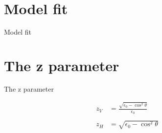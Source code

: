 \documentclass[10pt]{beamer}
\begin{document}
\section{Model fit}
\begin{frame}{Model fit}
\begin{minipage}{0.45\textwidth}
\resizebox{\textwidth}{!}{

}
\end{minipage}
\begin{minipage}{0.45\textwidth}
\resizebox{\textwidth}{!}{

}
\end{minipage}
\begin{minipage}{0.45\textwidth}
\resizebox{\textwidth}{!}{

}
\end{minipage}
\begin{minipage}{0.45\textwidth}

\end{minipage}

\end{frame}


\section{The z parameter}
\begin{frame}{The z parameter}
\begin{minipage}{0.35\textwidth}
\begin{align*}
z_V &= \frac{\sqrt{\epsilon_{0}-\cos^{2}\theta}}{\epsilon_{0}} \\
\\
z_H &= \sqrt{\epsilon_{0}-\cos^{2}\theta}
\end{align*}
\end{minipage}
\begin{minipage}{0.6\textwidth}
\resizebox{\textwidth}{!}{

}
\end{minipage}
\end{frame}


{\aauwavesbg
\begin{frame}
\end{frame}}
\end{document}
